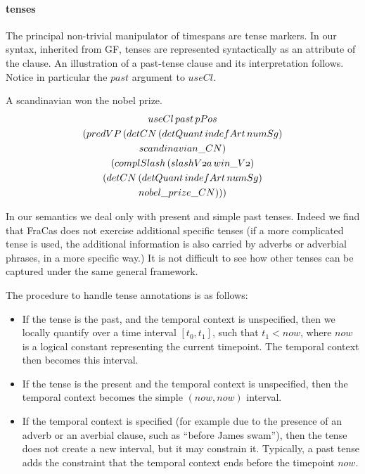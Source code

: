 \documentclass[a4paper,11pt]{article}
\newcommand\onelingex[1]{\begin{lingex}\item #1 \end{lingex}}
\newcommand\jp[1]{\todo[backgroundcolor=blue!10]{JP: #1}}
\begin{document}
\paragraph{tenses}

\newcommand\varid[1]{\mathnormal{#1}}
%
The principal non-trivial manipulator of timespans are tense
markers. In our syntax, inherited from GF, tenses are represented
syntactically as an attribute of the clause. An illustration of a
past-tense clause and its interpretation follows. Notice in particular
the $past$ argument to $useCl$.

\onelingex{A scandinavian won the nobel prize.\label{ex:onelingex}
\\
{\small\begin{multline*}
\varid{useCl}\, \varid{past}\, \varid{pPos}\\ (\varid{predVP}\, (\varid{detCN}\, (\varid{detQuant}\, \varid{indefArt}\, \varid{numSg})\\ \varid{scandinavian\_CN})\\ (\varid{complSlash}\, (\varid{slashV2a}\, \varid{win\_V2})\\ (\varid{detCN}\, (\varid{detQuant}\, \varid{indefArt}\, \varid{numSg})\\ \varid{nobel\_prize\_CN})))
\end{multline*}
}}
In our semantics we deal only with present and simple past
tenses. \jp{Is this enough for theory?} Indeed we find that FraCas
does not exercise additional specific tenses (if a more complicated
tense is used, the additional information is also carried by adverbs
or adverbial phrases, in a more specific way.) It is not difficult to see how other tenses can be captured under the same general framework. 

The procedure to handle tense annotations is as follows:
\begin{itemize}
\item If the tense is the past, and the temporal context is
  unspecified, then we locally quantify over a time interval
  $[t_0,t_1]$, such that $t_1 < now$, where $now$ is a logical
  constant representing the current timepoint. The temporal context
  then becomes this interval.
\item If the tense is the present and the temporal context is
  unspecified, then the temporal context becomes the simple
  $(now,now)$ interval.
\item If the temporal context is specified (for example due to the presence of an adverb or an
  averbial clause, such as ``before James swam''), then the tense does
  not create a new interval, but it may constrain it. Typically, a
  past tense adds the constraint that the temporal context ends before
  the timepoint $now$.
\end{itemize}
\end{document}
